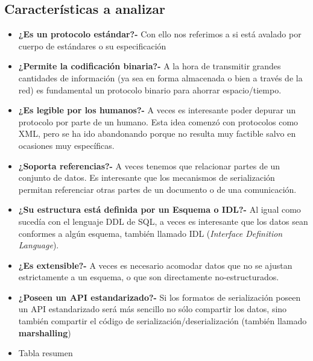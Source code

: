 \subsection{Características a analizar}
\begin{itemize}[label=\color{lightblue}\textbullet,leftmargin=*]
	\item \textbf{¿Es un protocolo estándar?-} Con ello nos referimos a si está avalado por  cuerpo de estándares o su especificación 
	\item \textbf{¿Permite la codificación binaria?-} A la hora de transmitir grandes cantidades de información (ya sea en forma almacenada o bien a través de la red) es fundamental un protocolo binario para ahorrar espacio/tiempo.
	\item \textbf{¿Es legible por los humanos?-} A veces es interesante poder depurar un protocolo por parte de un humano. Esta idea comenzó con protocolos como XML, pero se ha ido abandonando porque no resulta muy factible salvo en ocasiones muy específicas.
	\item \textbf{¿Soporta referencias?-} A veces tenemos que relacionar partes de un conjunto de datos. Es interesante que los mecanismos de serialización permitan referenciar otras partes de un documento o de una comunicación.
	\item \textbf{¿Su estructura está definida por un Esquema o IDL?-} Al igual como sucedía con el lenguaje DDL de SQL, a veces es interesante que los datos sean conformes a algún esquema, también llamado IDL (\textit{Interface Definition Language}).
	\item \textbf{¿Es extensible?-} A veces es necesario acomodar datos que no se ajustan estrictamente a un esquema, o que son directamente no-estructurados.
	\item \textbf{¿Poseen un API estandarizado?-} Si los formatos de serialización poseen un API estandarizado será más sencillo no sólo compartir los datos, sino también compartir el código de serialización/deserialización (también llamado \textbf{marshalling})
\end{itemize}
\begin{itemize}[label=\color{red}\textbullet, leftmargin=*]
	\item \color{lightblue}Tabla resumen
\end{itemize}
